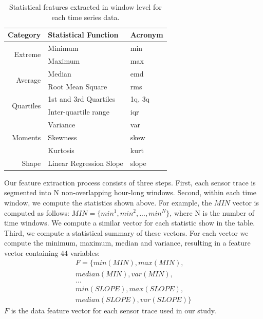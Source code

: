 \begin{table}[h]
\centering
\begin{tabular}{r|l|l}
\hline
Category                   & Statistical Function & \multicolumn{1}{l}{Acronym} \\ \hline\hline
\multirow{2}{*}{Extreme}   & Minimum                 & min                          \\ \cline{3-3} 
                           & Maximum                 & max                          \\ \hline
\multirow{2}{*}{Average}   & Median                  & emd                          \\ \cline{3-3} 
                           & Root Mean Square        & rms                          \\ \hline
\multirow{2}{*}{Quartiles} & 1st and 3rd Quartiles   & 1q, 3q                       \\ \cline{3-3} 
                           & Inter-quartile range    & iqr                          \\ \hline
\multirow{3}{*}{Moments}   & Variance                & var                          \\ \cline{3-3} 
                           & Skewness                & skew                         \\ \cline{3-3} 
                           & Kurtosis                & kurt                         \\ \hline
Shape                      & Linear Regression Slope & slope                        \\ \hline
\end{tabular}
\caption{Statistical features extracted in window level for each time series data.}
\label{table:fd}
\end{table}

Our feature extraction process consists of three steps.
First, each sensor trace is segmented into N non-overlapping hour-long windows. Second, within each time window, we compute the statistics shown above. 
For example, the $MIN$ vector is computed as follows: 
$MIN = \{min^{1}, min^{2}, ..., min^{N}\}$, where N is the number of time windows. We compute a similar vector for each statistic show in the table.
Third, we compute a statistical summary of these vectors. For each vector we compute the minimum, maximum, median and variance, resulting in a feature 
vector containing 44 variables:
\begin{displaymath}
\begin{split}
F = \{min(MIN), max(MIN), \\ 
median(MIN), var(MIN),\\
...\\
min(SLOPE), max(SLOPE), \\
median(SLOPE), var(SLOPE)\}
\end{split}
\end{displaymath}
$F$ is the data feature vector for each sensor trace used in our study.


